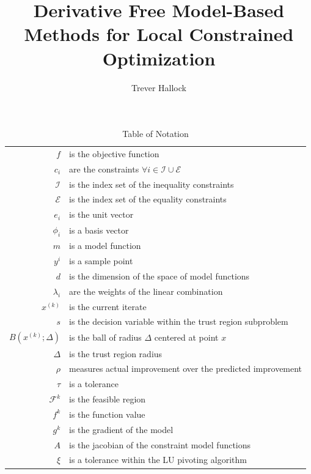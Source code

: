 \documentclass{article}
\title{Derivative Free Model-Based Methods for Local Constrained Optimization}
\author{Trever Hallock}
\begin{document}


\maketitle


\tableofcontents

\newpage





\begin{table}\caption{Table of Notation}
\begin{center}
\begin{tabular}{r p{10cm} }
$f$ & is the objective function \\
$c_i$ & are the constraints $\forall i \in \mathcal{I} \cup \mathcal{E} $ \\
$\mathcal{I}$ & is the index set of the inequality constraints \\
$\mathcal{E}$ & is the index set of the equality constraints \\
$e_i$ & is the unit vector \\
$\phi_i$ & is a basis vector \\
$m$ & is a model function \\
$y^i$ & is a sample point \\
$d$ & is the dimension of the space of model functions \\
$\lambda_i$ & are the weights of the linear combination \\
$x^{(k)}$ & is the current iterate \\
$s$ & is the decision variable within the trust region subproblem \\
$B(x^{(k)}; \Delta)$ & is the ball of radius $\Delta$ centered at point $x$ \\
$\Delta$ & is the trust region radius \\
$\rho$ & measures actual improvement over the predicted improvement \\
$\tau$ & is a tolerance \\
$\mathcal{F}^k$ & is the feasible region \\
$f^k$ & is the function value \\
$g^k$ & is the gradient of the model \\
$A$ & is the jacobian of the constraint model functions \\
$\xi$ & is a tolerance within the LU pivoting algorithm \\

\end{tabular}
\end{center}
\end{table}
\end{document}
